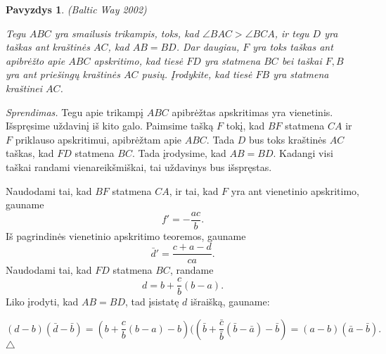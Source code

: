 \documentclass[11pt,a4paper,twoside]{book}
\newenvironment{sprendimas}{\noindent \textit{Sprendimas.}}{\hfill $\triangle$}
\newcounter{foo}[subsection]
\newtheorem{pavnr}[foo]{Pavyzdys}
\theoremstyle{definition} \newtheorem*{api}{Apibrėžimas}
\theoremstyle{remark} \newtheorem*{pastaba}{Pastaba}
\begin{document}
\begin{pavnr}
(Baltic Way 2002) 

Tegu $ABC$ yra smailusis trikampis, toks, kad $ \angle BAC > \angle BCA$, ir tegu $D$ yra taškas ant kraštinės $AC$, kad $AB = BD$. Dar daugiau, $F$ yra toks taškas ant apibrėžto apie $ABC$ apskritimo, kad tiesė $FD$ yra statmena $BC$ bei taškai $F, B$ yra ant priešingų kraštinės $AC$ pusių. Įrodykite, kad tiesė $FB$ yra statmena kraštinei $AC$.
\end{pavnr}

\begin{sprendimas}
Tegu apie trikampį $ABC$ apibrėžtas apskritimas yra vienetinis. Išspręsime uždavinį iš kito galo. Paimsime tašką $F$ tokį, kad $BF$ statmena $CA$ ir $F$ priklauso apskritimui, apibrėžtam apie $ABC$. Tada $D$ bus toks kraštinės $AC$ taškas, kad $FD$ statmena $BC$. Tada įrodysime, kad $AB=BD$. Kadangi visi taškai randami vienareikšmiškai, tai uždavinys bus išspręstas.

Naudodami tai, kad $BF$ statmena $CA$, ir tai, kad $F$ yra ant vienetinio apskritimo, gauname
$$ f'= - \frac {ac}{b}.$$
Iš pagrindinės vienetinio apskritimo teoremos, gauname 
$$\bar d' = \frac {c+a-d}{ca}.$$
Naudodami tai, kad $FD$ statmena $BC$, randame
$$ d= b+ \frac {c}{b}(b-a).$$
Liko įrodyti, kad $AB=BD$, tad įsistatę $d$ išraišką, gauname:

$$ (d-b)( \bar d - \bar b)=( b+ \frac {c}{b}(b-a)-b)(( \bar b+ \frac {\bar c}{\bar b}(\bar b-\bar a)-\bar b)=(a-b)( \bar a - \bar b).$$
\end{sprendimas}
\end{document}
